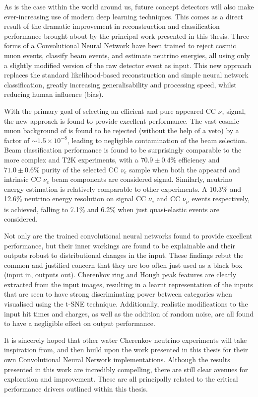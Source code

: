 As is the case within the world around us, future \chips concept detectors will also make
ever-increasing use of modern deep learning techniques. This comes as a direct result of the
dramatic improvement in \chipsfive reconstruction and classification performance brought about by
the principal work presented in this thesis. Three forms of a Convolutional Neural Network have
been trained to reject cosmic muon events, classify beam events, and estimate neutrino energies,
all using only a slightly modified version of the raw detector event as input. This new approach
replaces the standard likelihood-based reconstruction and simple neural network classification,
greatly increasing generalisability and processing speed, whilst reducing human influence (bias).

With the primary goal of selecting an efficient and pure appeared CC $\nu_{e}$ signal, the new
approach is found to provide excellent performance. The vast cosmic muon background of \chipsfive
is found to be rejected (without the help of a veto) by a factor of $\sim1.5\times10^{-8}$,
leading to negligible contamination of the beam selection. Beam classification performance is
found to be surprisingly comparable to the more complex \nova and T2K experiments, with a
$70.9\pm0.4\%$ efficiency and $71.0\pm0.6\%$ purity of the selected CC $\nu_{e}$ sample when both
the appeared and intrinsic CC $\nu_{e}$ beam components are considered signal. Similarly, neutrino
energy estimation is relatively comparable to other experiments. A 10.3\% and 12.6\% neutrino
energy resolution on signal CC $\nu_{e}$ and CC $\nu_{\mu}$ events respectively, is achieved,
falling to 7.1\% and 6.2\% when just quasi-elastic events are considered. 

Not only are the trained convolutional neural networks found to provide excellent performance, but
their inner workings are found to be explainable and their outputs robust to distributional
changes in the input. These findings rebut the common and justified concern that they are too
often just used as a black box (input in, outputs out). Cherenkov ring and Hough peak features are
clearly extracted from the input images, resulting in a learnt representation of the inputs that
are seen to have strong discriminating power between categories when visualised using the t-SNE
technique. Additionally, realistic modifications to the input hit times and charges, as well as
the addition of random noise, are all found to have a negligible effect on output performance.

It is sincerely hoped that other water Cherenkov neutrino experiments will take inspiration from,
and then build upon the work presented in this thesis for their own Convolutional Neural Network
implementations. Although the results presented in this work are incredibly compelling, there are
still clear avenues for exploration and improvement. These are all principally related to the
critical performance drivers outlined within this thesis. 

